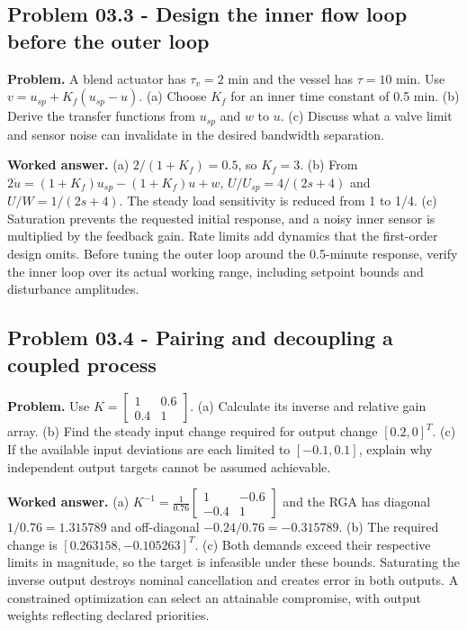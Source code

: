 \documentclass[11pt,a4paper]{article}
\begin{document}
\subsection{Problem 03.3 - Design the inner flow loop before the outer loop}
\textbf{Problem.} A blend actuator has $\tau_v=2$ min and the vessel has $\tau=10$ min. Use $v=u_{sp}+K_f(u_{sp}-u)$. (a) Choose $K_f$ for an inner time constant of 0.5 min. (b) Derive the transfer functions from $u_{sp}$ and $w$ to $u$. (c) Discuss what a valve limit and sensor noise can invalidate in the desired bandwidth separation.


\textbf{Worked answer.} (a) $2/(1+K_f)=0.5$, so $K_f=3$. (b) From $2\dot u=(1+K_f)u_{sp}-(1+K_f)u+w$, $U/U_{sp}=4/(2s+4)$ and $U/W=1/(2s+4)$. The steady load sensitivity is reduced from 1 to 1/4. (c) Saturation prevents the requested initial response, and a noisy inner sensor is multiplied by the feedback gain. Rate limits add dynamics that the first-order design omits. Before tuning the outer loop around the 0.5-minute response, verify the inner loop over its actual working range, including setpoint bounds and disturbance amplitudes.

\subsection{Problem 03.4 - Pairing and decoupling a coupled process}
\textbf{Problem.} Use $K=\begin{bmatrix}1&0.6\\0.4&1\end{bmatrix}$. (a) Calculate its inverse and relative gain array. (b) Find the steady input change required for output change $[0.2,0]^T$. (c) If the available input deviations are each limited to $[-0.1,0.1]$, explain why independent output targets cannot be assumed achievable.


\textbf{Worked answer.} (a) $K^{-1}=\frac1{0.76}\begin{bmatrix}1&-0.6\\-0.4&1\end{bmatrix}$ and the RGA has diagonal $1/0.76=1.315789$ and off-diagonal $-0.24/0.76=-0.315789$. (b) The required change is $[0.263158,-0.105263]^T$. (c) Both demands exceed their respective limits in magnitude, so the target is infeasible under these bounds. Saturating the inverse output destroys nominal cancellation and creates error in both outputs. A constrained optimization can select an attainable compromise, with output weights reflecting declared priorities.
\end{document}
